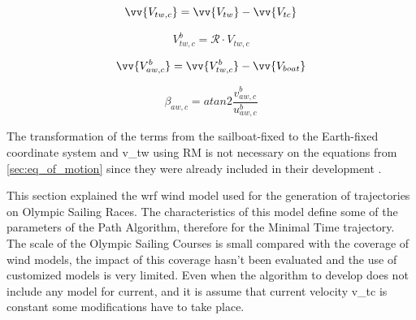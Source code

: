 \begin{equation}\label{eq:V_twModifV_C}
    \vv{V_{tw,c}}=\vv{V_{tw}}- \vv{V_{tc}}
\end{equation}

\begin{equation}\label{eq:v_twCurBoat}
    V_{tw,c}^b=\mathcal{R} \cdot V_{tw,c}
\end{equation}

\begin{equation} \label{eq:VelCurrWind_boat}
    \vv{V_{aw,c}^b}= \vv{V_{tw,c}^b} - \vv{V_{boat}}
\end{equation}

\begin{equation}\label{eq:b_tw_c}
    \beta_{aw,c}= atan2 \frac {v_{aw,c}^b}{u_{aw,c}^b}
\end{equation}

The transformation of the terms from the sailboat-fixed to the Earth-fixed coordinate system and \acrshort{v_tw} using \acrshort{RM} is not necessary on the equations from \ref{sec:eq_of_motion} since they were already included in their development \cite{keuning2004mathematical}.\par  




This section explained the \acrshort{wrf} wind model used for the generation of trajectories on Olympic Sailing Races. The characteristics of this model define some of the parameters of the Path Algorithm, therefore for the Minimal Time trajectory. The scale of the Olympic Sailing Courses is small compared with the coverage of wind models, the impact of this coverage hasn't been evaluated and the use of customized models is very limited. Even when the algorithm to develop does not include any model for current, and it is assume that current velocity \acrshort{v_tc} is constant some modifications have to take place. 